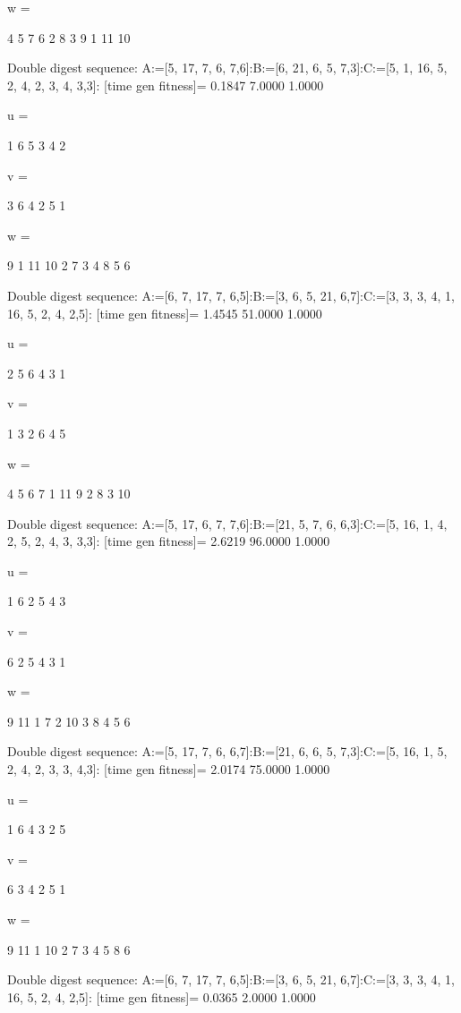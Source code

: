 w =

     4     5     7     6     2     8     3     9     1    11    10

Double digest sequence:
A:=[5, 17, 7, 6, 7,6]:B:=[6, 21, 6, 5, 7,3]:C:=[5, 1, 16, 5, 2, 4, 2, 3, 4, 3,3]:
[time gen fitness]=
    0.1847    7.0000    1.0000


u =

     1     6     5     3     4     2


v =

     3     6     4     2     5     1


w =

     9     1    11    10     2     7     3     4     8     5     6

Double digest sequence:
A:=[6, 7, 17, 7, 6,5]:B:=[3, 6, 5, 21, 6,7]:C:=[3, 3, 3, 4, 1, 16, 5, 2, 4, 2,5]:
[time gen fitness]=
    1.4545   51.0000    1.0000


u =

     2     5     6     4     3     1


v =

     1     3     2     6     4     5


w =

     4     5     6     7     1    11     9     2     8     3    10

Double digest sequence:
A:=[5, 17, 6, 7, 7,6]:B:=[21, 5, 7, 6, 6,3]:C:=[5, 16, 1, 4, 2, 5, 2, 4, 3, 3,3]:
[time gen fitness]=
    2.6219   96.0000    1.0000


u =

     1     6     2     5     4     3


v =

     6     2     5     4     3     1


w =

     9    11     1     7     2    10     3     8     4     5     6

Double digest sequence:
A:=[5, 17, 7, 6, 6,7]:B:=[21, 6, 6, 5, 7,3]:C:=[5, 16, 1, 5, 2, 4, 2, 3, 3, 4,3]:
[time gen fitness]=
    2.0174   75.0000    1.0000


u =

     1     6     4     3     2     5


v =

     6     3     4     2     5     1


w =

     9    11     1    10     2     7     3     4     5     8     6

Double digest sequence:
A:=[6, 7, 17, 7, 6,5]:B:=[3, 6, 5, 21, 6,7]:C:=[3, 3, 3, 4, 1, 16, 5, 2, 4, 2,5]:
[time gen fitness]=
    0.0365    2.0000    1.0000


